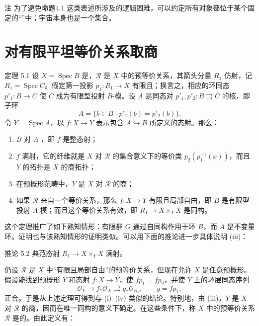 \begin{statement}{注}
为了避免命题4.1 这类表述所涉及的逻辑困难，可以约定所有对象都位于某个固定的“”中；宇宙本身也是一个集合。
\end{statement}

\section{对有限平坦等价关系取商}
\begin{statement}{定理 5.1}
设 $X=\operatorname{Spec}B$ 是，$\mathcal R$ 是 $X$ 中的预等价关系，其箭头分量 $R_1$ 仿射，记 $R_1=\operatorname{Spec}C$。假定第一投影 $p_1:R_1\to X$ 有限且；换言之，相应的环同态 $p'_1:B\to C$ 使 $C$ 成为有限型投射 $B$-模。设 $A$ 是同态对 $p'_1,p'_2:B\rightrightarrows C$ 的核，即子环
\[
 A=\{b\in B\mid p'_1(b)=p'_2(b)\}.
\]
令 $Y=\operatorname{Spec}A$，以 $f:X\to Y$ 表示包含 $A\hookrightarrow B$ 所定义的态射。那么：
\begin{enumerate}[label=(\roman*)]
 \item $B$ 对 $A$ ，即 $f$ 是整态射；
 \item $f$ 满射，它的纤维就是 $X$ 对 $\mathcal R$ 的集合意义下的等价类
 $p_2(p_1^{-1}(x))$，而且 $Y$ 的拓扑是 $X$ 的商拓扑；
 \item 在预概形范畴中，$Y$ 是 $X$ 对 $\mathcal R$ 的商；
 \item 如果 $\mathcal R$ 来自一个等价关系，那么 $f:X\to Y$ 有限且局部自由，即 $B$ 是有限型投射 $A$-模；而且这个等价关系有效，即 $R_1\to X\times_YX$ 是同构。
\end{enumerate}
\end{statement}

这个定理推广了如下熟知情形：有限群 $G$ 通过自同构作用于环 $B$，而 $A$ 是不变量环。证明也与该熟知情形的证明类似。可以用下面的推论进一步具体说明 (iii)：

\begin{statement}{推论 5.2}
典范态射 $R_1\to X\times_YX$ 满射。
\end{statement}

仍设 $\mathcal R$ 是 $X$ 中“有限且局部自由”的预等价关系，但现在允许 $X$ 是任意预概形。假设能找到预概形 $Y$ 和态射 $f:X\to Y$，使 $fp_1=fp_2$，并使 $Y$ 上的环层同态序列
\[
 \mathcal O_Y\longrightarrow f_*\mathcal O_X
 \rightrightarrows g_*\mathcal O_{R_1},
 \qquad g=fp_1,
\]
正合。于是从上述定理可得到与 (i)--(iv) 类似的结论。特别地，由 (iii)，$Y$ 是 $X$ 对 $\mathcal R$ 的商，因而在唯一同构的意义下确定。在这些条件下，称 $X$ 中的预等价关系 $\mathcal R$ 是的。由此定义有：

